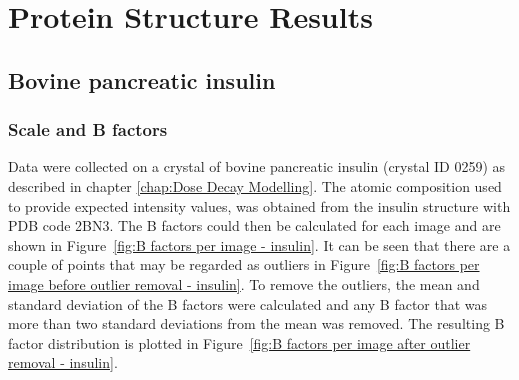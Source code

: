 \section{Protein Structure Results}
\label{sec:Protein Structure Results}

\subsection{Bovine pancreatic insulin}
\label{sub:Bovine pancreatic insulin}

\subsubsection{Scale and B factors}
\label{subs:Scale and B factors - insulin}
Data were collected on a crystal of bovine pancreatic insulin (crystal ID 0259) as described in chapter \ref{chap:Dose Decay Modelling}.
The atomic composition used to provide expected intensity values, was obtained from the insulin structure with PDB code 2BN3.
The B factors could then be calculated for each image and are shown in Figure~\ref{fig:B factors per image - insulin}.
It can be seen that there are a couple of points that may be regarded as outliers in Figure~\ref{fig:B factors per image before outlier removal - insulin}.
To remove the outliers, the mean and standard deviation of the B factors were calculated and any B factor that was more than two standard deviations from the mean was removed.
The resulting B factor distribution is plotted in Figure~\ref{fig:B factors per image after outlier removal - insulin}.

